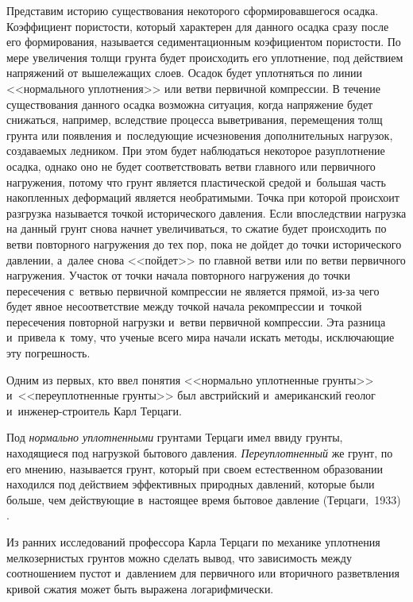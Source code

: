 Представим историю существования некоторого сформировавшегося осадка. 
Коэффициент пористости, который характерен для данного осадка сразу после его формирования, называется седиментационным коэфициентом пористости. 
По мере увеличения толщи грунта будет происходить его уплотнение, под действием напряжений от вышележащих слоев.
Осадок будет уплотняться по линии <<нормального уплотнения>> или ветви первичной компрессии. 
В течение существования данного осадка возможна ситуация, когда напряжение будет снижаться, например, вследствие процесса выветривания, перемещения толщ грунта или появления и~последующие исчезновения дополнительных нагрузок, создаваемых ледником. 
При этом будет наблюдаться некоторое разуплотнение осадка, однако оно не будет соответствовать ветви главного или первичного нагружения, потому что грунт является пластической средой и~большая часть накопленных деформаций является необратимыми. 
Точка при которой происхоит разгрузка называется точкой исторического давления. 
Если впоследствии нагрузка на данный грунт снова начнет увеличиваться, то сжатие будет происходить по ветви повторного нагружения до тех пор, пока не дойдет до точки исторического давлении, а~далее снова <<пойдет>> по главной ветви или по ветви первичного нагружения. 
Участок от точки начала повторного нагружения до точки пересечения с~ветвью первичной компрессии не является прямой, из-за чего будет явное несоответствие между точкой начала рекомпрессии и~точкой пересечения повторной нагрузки и~ветви первичной компрессии. 
Эта разница и~привела к~тому, что ученые всего мира начали искать методы, исключающие эту погрешность.

Одним из первых, кто ввел понятия <<нормально уплотненные грунты>> и~<<переуплотненные грунты>> был австрийский и~американский геолог и~инженер-строитель Карл Терцаги.

 Под \textit{нормально уплотненными} грунтами Терцаги имел ввиду грунты, находящиеся под нагрузкой бытового давления.
 \textit{Переуплотненный} же грунт, по его мнению, называется грунт, который при своем естественном образовании находился под действием эффективных природных давлений, которые были больше, чем действующие в~настоящее время бытовое давление (Терцаги,~1933) \cite{terz1933}.

Из ранних исследований профессора Карла Терцаги по механике уплотнения мелкозернистых грунтов можно сделать вывод, что зависимость между соотношением пустот и~давлением для первичного или вторичного разветвления кривой сжатия может быть выражена логарифмически. 

